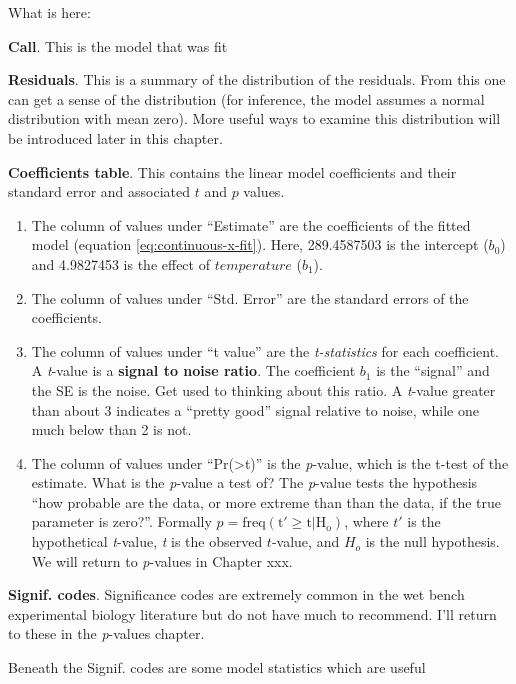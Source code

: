 \documentclass[]{book}
\providecommand{\tightlist}{%
  \setlength{\itemsep}{0pt}\setlength{\parskip}{0pt}}
\begin{document}
What is here:

\textbf{Call}. This is the model that was fit

\textbf{Residuals}. This is a summary of the distribution of the residuals. From this one can get a sense of the distribution (for inference, the model assumes a normal distribution with mean zero). More useful ways to examine this distribution will be introduced later in this chapter.

\textbf{Coefficients table}. This contains the linear model coefficients and their standard error and associated \(t\) and \(p\) values.

\begin{enumerate}
\def\labelenumi{\arabic{enumi}.}
\tightlist
\item
  The column of values under ``Estimate'' are the coefficients of the fitted model (equation \eqref{eq:continuous-x-fit}). Here, 289.4587503 is the intercept (\(b_0\)) and 4.9827453 is the effect of \(temperature\) (\(b_1\)).
\item
  The column of values under ``Std. Error'' are the standard errors of the coefficients.
\item
  The column of values under ``t value'' are the \emph{t-statistics} for each coefficient. A \emph{t}-value is a \textbf{signal to noise ratio}. The coefficient \(b_1\) is the ``signal'' and the SE is the noise. Get used to thinking about this ratio. A \emph{t}-value greater than about 3 indicates a ``pretty good'' signal relative to noise, while one much below than 2 is not.
\item
  The column of values under ``Pr(\textgreater\textbar t\textbar)'' is the \emph{p}-value, which is the t-test of the estimate. What is the \emph{p}-value a test of? The \emph{p}-value tests the hypothesis ``how probable are the data, or more extreme than than the data, if the true parameter is zero?''. Formally \(p = \mathrm{freq(t' \ge t|H_o)}\), where \(t'\) is the hypothetical \emph{t}-value, \emph{t} is the observed \(t\)-value, and \(H_o\) is the null hypothesis. We will return to \emph{p}-values in Chapter xxx.
\end{enumerate}

\textbf{Signif. codes}. Significance codes are extremely common in the wet bench experimental biology literature but do not have much to recommend. I'll return to these in the \emph{p}-values chapter.

Beneath the Signif. codes are some model statistics which are useful
\end{document}

